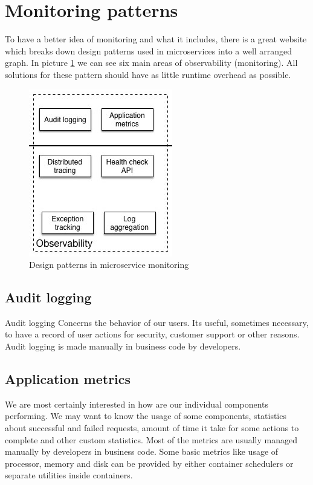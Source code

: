 \documentclass[12pt,oneside]{fithesis2}
\begin{document}
\section{Monitoring patterns}

To have a better idea of monitoring and what it includes, there is a great website\cite{ms_patterns} which breaks down design patterns used in microservices into a well arranged graph. In picture \ref{observability} we can see six main areas of observability (monitoring). All solutions for these pattern should have as little runtime overhead as possible.

\begin{figure}[ht!]
	\label{observability}
	\centering
	\includegraphics{images/observability.jpg}
	\caption{Design patterns in microservice monitoring\cite{ms_patterns}}
\end{figure}

\subsection{Audit logging}
Audit logging Concerns the behavior of our users. Its useful, sometimes necessary, to have a record of user actions for security, customer support or other reasons. Audit logging is made manually in business code by developers.

\subsection{Application metrics}
We are most certainly interested in how are our individual components performing. We may want to know the usage of some components, statistics about successful and failed requests, amount of time it take for some actions to complete and other custom statistics. Most of the metrics are usually managed manually by developers in business code. Some basic metrics like usage of processor, memory and disk can be provided by either container schedulers or separate utilities inside containers.
\end{document}
